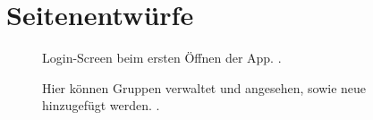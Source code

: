 \documentclass[parskip=full,11pt]{scrartcl}
\begin{document}
\pagebreak
\appendix

\section{Seitenentwürfe}

\begin{figure}[hb]
	\caption{\label{fig:menu}
		Login-Screen beim ersten Öffnen der App.
		 .
	}
\end{figure}

\begin{figure}[hb]
	\caption{\label{fig:groups}
		Hier können Gruppen verwaltet und angesehen, sowie neue hinzugefügt werden.
		.
	}
\end{figure}
\end{document}
